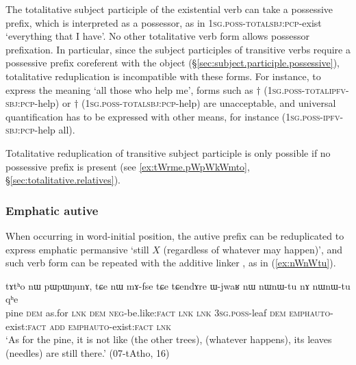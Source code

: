 The totalitative subject participle of the existential verb  can take a possessive prefix, which is interpreted as a possessor, as in  \textsc{1sg}.\textsc{poss}-\textsc{total}\redp{}\textsc{sbj}:\textsc{pcp}-exist `everything that I have'. No other totalitative verb form allows possessor prefixation. In particular, since the subject participles of transitive verbs require a possessive prefix coreferent with the object (§\ref{sec:subject.participle.possessive}), totalitative reduplication is incompatible with these forms. For instance, to express the meaning `all those who help me', forms such as $\dagger$ (\textsc{1sg}.\textsc{poss}-\textsc{total}\redp{}\textsc{ipfv}-\textsc{sbj}:\textsc{pcp}-help) or $\dagger$ (\textsc{1sg}.\textsc{poss}-\textsc{total}\redp{}\textsc{sbj}:\textsc{pcp}-help) are unacceptable, and universal quantification has to be expressed with other means, for instance  (\textsc{1sg}.\textsc{poss}-\textsc{ipfv}-\textsc{sbj}:\textsc{pcp}-help all).

Totalitative reduplication of transitive subject participle is only possible if no possessive prefix is present (see \ref{ex:tWrme.pWpWkWmto}, §\ref{sec:totalitative.relatives}).

 

\subsubsection{Emphatic autive}  \label{sec:emphatic.autive}
When occurring in word-initial position, the  autive prefix  can be reduplicated to express emphatic permansive `still $X$ (regardless of whatever may happen)', and such verb form can be repeated with the additive linker , as in (\ref{ex:nWnWtu}).

\begin{exe}
\ex \label{ex:nWnWtu}
\gll tɤtʰo nɯ pɯpɯŋunɤ, tɕe nɯ mɤ-fse tɕe tɕendɤre ɯ-jwaʁ nɯ nɯ\redp{}nɯ-tu nɤ nɯ\redp{}nɯ-tu qʰe \\
pine \textsc{dem} as.for \textsc{lnk} \textsc{dem} \textsc{neg}-be.like:\textsc{fact} \textsc{lnk}  \textsc{lnk} \textsc{3sg}.\textsc{poss}-leaf \textsc{dem} \textsc{emph}\redp{}\textsc{auto}-exist:\textsc{fact} \textsc{add} \textsc{emph}\redp{}\textsc{auto}-exist:\textsc{fact} \textsc{lnk} \\
\glt `As for the pine, it is not like (the other trees), (whatever happens), its leaves (needles) are still there.'  (07-tAtho, 16)
\end{exe}

